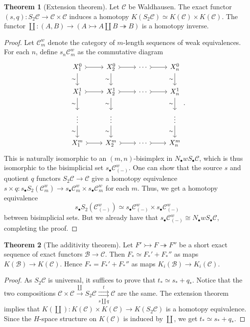 \documentclass[10pt,letterpaper,cm]{nupset}
\theoremstyle{definition}
\theoremstyle{theorem}
\newtheorem{theorem}{Theorem}
\theoremstyle{remark}
\newcommand{\1}{\mathbf{1}}
\renewcommand{\b}{\mathscr{B}}
\renewcommand{\c}{\mathscr{C}}
\newcommand{\0}{\vec 0}
\begin{document}
\begin{theorem}[Extension theorem]
Let $\c$ be Waldhausen. The exact functor $(s, q) : S_2 \c \to \c \times \c$ induces  a homotopy $K(S_2\c) \simeq K(\c) \times K(\c)$. The functor $\coprod : (A, B) \to (A \rightarrowtail A \coprod B \twoheadrightarrow  B)$ is a homotopy inverse.
\end{theorem}
\begin{proof}
Let $\c^w_m$ denote the category of $m$-length sequences of weak equivalences. For each $n$, define $s_n\c^w_m$ as the commutative diagram
\[
\begin{tikzcd}
 X_1^0 \arrow[d, "\sim"'] \arrow[r, tail] & X_2^0 \arrow[r, tail] \arrow[d, "\sim"'] & \cdots \arrow[r, tail] & X_n^0 \arrow[d, "\sim"'] \\
X_1^1 \arrow[d, "\sim"'] \arrow[r, tail] & X_2^1 \arrow[r, tail] \arrow[d, "\sim"'] & \cdots \arrow[r, tail] & X_n^1 \arrow[d, "\sim"'] \\
  \vdots \arrow[d, "\sim"'] & \vdots \arrow[d, "\sim"'] &  & \vdots \arrow[d, "\sim"'] \\
 X_1^m \arrow[r, tail] & X_2^m \arrow[r, tail] & \cdots \arrow[r, tail] & X_n^m
\end{tikzcd}
.\]
This is naturally isomorphic to an $(m, n)$-bisimplex in $N_{\bullet}w S_{\bullet}\c$, which is thus isomorphic to the bisimplicial set $s_{\bullet}\c^w_{(-)}$. One can show that the source $s$ and quotient $q$ functors  $S_2 \c \to \c$ give a homotopy equivalence $s \times q : s_{\bullet}S_2(\c^w_m) \to s_{\bullet}\c^w_m \times s_{\bullet}\c^w_m$ for each $m$. Thus, we get a homotopy equivalence  $$s_{\bullet}S_2(\c^w_{(-)}) \simeq s_{\bullet}\c^w_{(-)} \times s_{\bullet}\c^w_{(-)}$$ between bisimplicial sets. But we already have that $s_{\bullet}\c^w_{(-)} \cong N_{\bullet}w S_{\bullet}\c$, completing the proof.
\end{proof}

\begin{theorem}[The additivity theorem]
Let $F' \rightarrowtail F \twoheadrightarrow F''$ be a short exact sequence of exact functors $\b \to \c$. Then $F_{\ast} \simeq F_{\ast}' + F_{\ast}''$ as maps $K(\b) \to K(\c)$. Hence $F_{\ast} = F_{\ast}' + F_{\ast}''$ as maps $K_i(\b) \to K_i(\c)$. 
\end{theorem}
\begin{proof}
As $S_2\c$ is universal, it suffices to prove that $t_{\ast}  \simeq s_{\ast} + q_{\ast}$. Notice that the two compositions $\c \times \c \overset{\coprod}{\longrightarrow} S_2 \c  \underset{s \coprod q}{\overset{t}{\rightrightarrows}} \c$ are the same. The extension theorem implies that $K(\coprod): K(\c) \times K(\c) \to K(S_2 \c)$ is a homotopy equivalence. Since the $H$-space structure on $K(\c)$ is induced by $\coprod$, we get $t_{\ast}  \simeq s_{\ast} + q_{\ast}$. 
\end{proof}
\end{document}
